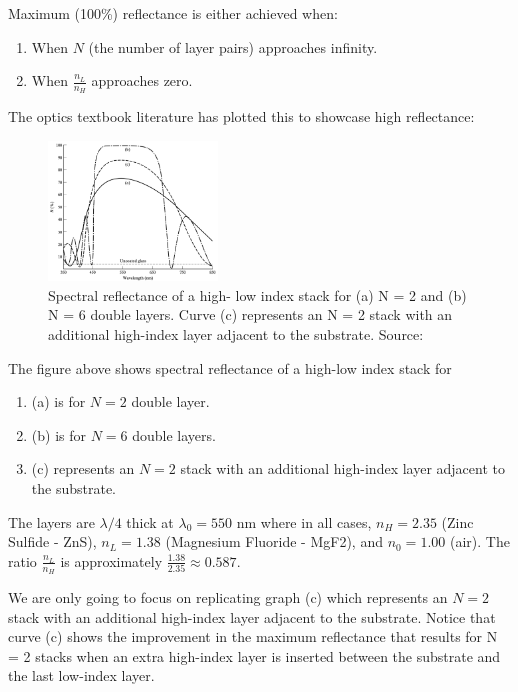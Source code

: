 Maximum (100\%) reflectance is either achieved when:
\begin{enumerate}
    \item When $N$ (the number of layer pairs) approaches infinity.
    \item When $\frac{n_L}{n_H}$ approaches zero.
\end{enumerate}

The optics textbook literature has plotted this to showcase high reflectance:

\begin{figure}[ht!]
  \centering
  \includegraphics[width=0.4\textwidth]{Chapters/Figures/Chapter 4 Figures/High-Reflectance Graphs in the Optics Book.png}
  \caption{Spectral reflectance of a high- low index stack for (a) N = 2 and (b) N = 6 double layers. Curve (c) represents an N = 2 stack with an additional high-index layer adjacent to the substrate. Source: \cite{pedrotti_introduction_2007}}
  \label{fig:High-reflectance plots from Optics book}
\end{figure}

The figure above shows spectral reflectance of a high-low index stack for
\begin{enumerate}
    \item (a) is for $N = 2$ double layer.
    \item (b) is for $N = 6$ double layers.
    \item (c) represents an $N = 2$ stack with an additional high-index layer adjacent to the substrate.
\end{enumerate}

The layers are $\lambda/4$ thick at $\lambda_0=550$ nm where in all cases, $n_H=2.35$ (Zinc Sulfide - ZnS), $n_L=1.38$ (Magnesium Fluoride - MgF2), and $n_0=1.00$ (air). The ratio $\frac{n_L}{n_H}$ is approximately $\frac{1.38}{2.35} \approx 0.587$.

We are only going to focus on replicating graph (c) which represents an $N = 2$ stack with an additional high-index layer adjacent to the substrate. Notice that curve (c) shows the improvement in the maximum reflectance that results for N = 2 stacks when an extra high-index layer is inserted between the substrate and the last low-index layer.

